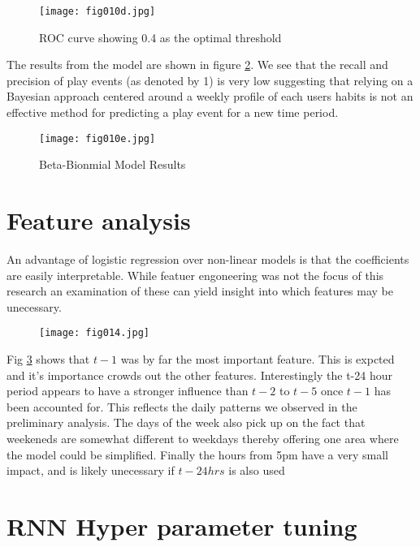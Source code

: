 \begin{figure}[h!]
	\centering
	\texttt{[image: fig010d.jpg]}
	\caption{ROC curve showing 0.4 as the optimal threshold}
	\label{fig10d}
\end{figure} 

The results from the model are shown in figure \ref{fig10e}. We see that the recall and precision of play events (as denoted by 1) is very low suggesting that relying on a Bayesian approach centered around a weekly profile of each users habits is not an effective method for predicting a play event for a new time period.

\begin{figure}[h!]
	\centering
	\texttt{[image: fig010e.jpg]}
	\caption{Beta-Bionmial Model Results}
	\label{fig10e}
\end{figure} 

\section{Feature analysis}

An advantage of logistic regression over non-linear models is that the coefficients are easily interpretable. While featuer engoneering was not the focus of this research an examination of these can yield insight into which features may be unecessary. 

\begin{figure}[h!]
	\centering
	\texttt{[image: fig014.jpg]}
	\caption{}
	\label{fig14}
\end{figure} 

Fig \ref{fig14} shows that $t-1$ was by far the most important feature. This is expcted and it's importance crowds out the other features. Interestingly the t-24 hour period appears to have a stronger influence than $t-2$ to $t-5$ once $t-1$ has been accounted for. This reflects the daily patterns we observed in the preliminary analysis. The days of the week also pick up on the fact that weekeneds are somewhat different to weekdays thereby offering one area where the model could be simplified. Finally the hours from 5pm have a very small impact, and is likely unecessary if $t-24hrs$ is also used

\section{RNN Hyper parameter tuning}

